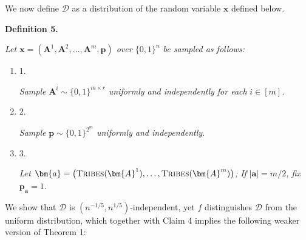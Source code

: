 \documentclass[10pt,a4paper]{article}
\begin{document}
We now define $\mathcal{D}$ as a distribution of the random variable $\bm{x}$ defined below.\par





\par\medskip\noindent\textbf{
\textbf{Definition 5}\textbf{.}
}\par



\emph{Let $\bm{x}=(\bm{A}^{1},\bm{A}^{2},\dots,\bm{A}^{m},\bm{p})$ over $\{0,1\}^{n}$ be sampled as follows:}\par


\begin{enumerate}


\item[] 
1. 


\emph{Sample }$\bm{A}^{i}\sim\{0,1\}^{m\times r}$\emph{ uniformly and independently for each }$i\in[m]$\emph{.}\par





\item[] 
2. 


\emph{Sample }$\bm{p}\sim\{0,1\}^{2^{m}}$\emph{ uniformly and independently.}\par





\item[] 
3. 


\emph{Let }$\bm{a}=\big{(}\textsc{Tribes}(\bm{A}^{1}),\dots,\textsc{Tribes}(\bm{A}^{m})\big{)}$\emph{; If }$|\bm{a}|=m/2$\emph{,
fix }$\bm{p}_{\bm{a}}=1$\emph{.}\par





\end{enumerate}






We show that $\mathcal{D}$ is $(n^{-1/5},n^{1/5})$-independent, yet $f$ distinguishes $\mathcal{D}$ from the uniform
distribution, which together with Claim 4 implies the following weaker version
of Theorem 1:\par



\end{document}
